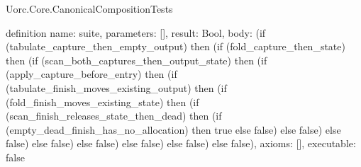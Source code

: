\begin{lexlean}{Uorc.Core.CanonicalCompositionTests}
\begin{semanticmodule}
definition{
  name: suite,
  parameters: [],
  result: Bool,
  body: (if (tabulate_capture_then_empty_output) then (if (fold_capture_then_state) then (if (scan_both_captures_then_output_state) then (if (apply_capture_before_entry) then (if (tabulate_finish_moves_existing_output) then (if (fold_finish_moves_existing_state) then (if (scan_finish_releases_state_then_dead) then (if (empty_dead_finish_has_no_allocation) then true else false) else false) else false) else false) else false) else false) else false) else false),
  axioms: [],
  executable: false
}
\end{semanticmodule}
\end{lexlean}
